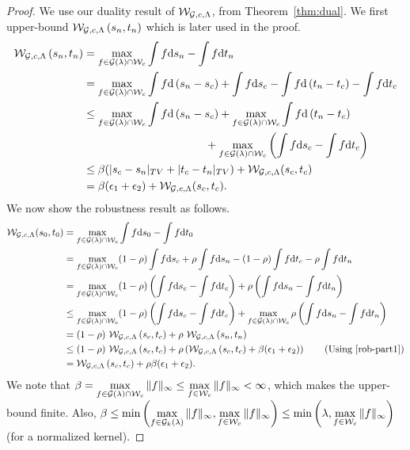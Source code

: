 \begin{proof}
We use our duality result of $\mathcal{W}_{\mathcal{G}, c, \Lambda}$, from Theorem~\ref{thm:dual}. We first upper-bound $\mathcal{W}_{\mathcal{G}, c, \Lambda}\left(s_n, t_n\right)$ which is later used in the proof.
    \begin{align}
        \mathcal{W}_{\mathcal{G}, c, \Lambda}\left(s_n, t_n\right) & = \max\limits_{f\in \mathcal{G}(\lambda)\cap \mathcal{W}_c} \int f \textup{d}s_n - \int f \textup{d}t_n\nonumber\\
        & = \max\limits_{f\in \mathcal{G}(\lambda)\cap \mathcal{W}_c} \int f \textup{d}\left(s_n -s_c\right) + \int f \textup{d} s_c - \int f \textup{d}\left(t_n -t_c\right) - \int f \textup{d} t_c\nonumber\\
        & \leq \max\limits_{f\in \mathcal{G}(\lambda)\cap \mathcal{W}_c} \int f \textup{d}\left(s_n -s_c\right) + \max\limits_{f\in \mathcal{G}(\lambda)\cap \mathcal{W}_c} \int f \textup{d}\left(t_n -t_c\right) \nonumber\\
        &\qquad\qquad\qquad\qquad\qquad\quad+ \max\limits_{f\in \mathcal{G}(\lambda)\cap \mathcal{W}_c} \left( \int f \textup{d} s_c - \int f \textup{d}t_c\right) \nonumber\\
        & \leq \beta (|s_c-s_n|_{TV} + |t_c-t_n|_{TV})+ \mathcal{W}_{\mathcal{G}, c, \Lambda}(s_c, t_c) \nonumber\\
        & = \beta (\epsilon_1+\epsilon_2) + \mathcal{W}_{\mathcal{G}, c, \Lambda}(s_c, t_c). \label{rob-part1}
    \end{align}
    We now show the robustness result as follows.
    \begin{align*}
        \calWI(s_0, t_0)& = \max\limits_{f\in \calG(\lambda)\cap \calW_c} \int f \textup{d}s_0 -\int f \textup{d}t_0 \\ 
        & = \max\limits_{f\in \calG(\lambda)\cap \calW_c} (1-\rho)\int f \textup{d}s_c + \rho \int f \textup{d}s_n -(1-\rho)\int f \textup{d}t_c - \rho \int f \textup{d}t_n\\
        & = \max\limits_{f\in \calG(\lambda)\cap \calW_c} (1-\rho) \left( \int f \textup{d}s_c - \int f \textup{d}t_c \right) + \rho 
        \left( \int f \textup{d}s_n - \int f \textup{d}t_n \right)\\
        & \leq \max\limits_{f\in \calG(\lambda)\cap \calW_c} (1-\rho) \left( \int f \textup{d}s_c - \int f \textup{d}t_c \right) + \max\limits_{f \in \calG(\lambda)\cap \calW_c}\rho 
        \left( \int f \textup{d}s_n - \int f \textup{d}t_n \right)\\
        & = (1-\rho)\ \calWI\left(s_c, t_c\right)+\rho\ \calWI\left(s_n, t_n\right)
        \\
        & \leq (1-\rho)\ \calWI\left(s_c, t_c\right)+\rho \left(\calWI\left(s_c, t_c\right)+\beta(\epsilon_1+\epsilon_2)\right)  \tag{Using \ref{rob-part1}}\\
        & = \calWI\left(s_c, t_c\right) + \rho \beta (\epsilon_1+\epsilon_2).
    \end{align*}
We note that $\beta = \max\limits_{f\in \mathcal{G}(\lambda)\cap \mathcal{W}_c}\|f\|_{\infty}\leq \max\limits_{f\in \mathcal{W}_c}\|f\|_{\infty}<\infty$, which makes the upper-bound finite. \newline Also, $\beta\leq \min\left(\max\limits_{f\in\mathcal{G}_k(\lambda)} \|f\|_\infty, \max\limits_{f\in\mathcal{W}_c} \|f\|_\infty\right) \leq \min\left(\lambda,\max\limits_{f\in\mathcal{W}_c} \|f\|_\infty \right)$ (for a normalized kernel).


\end{proof}
